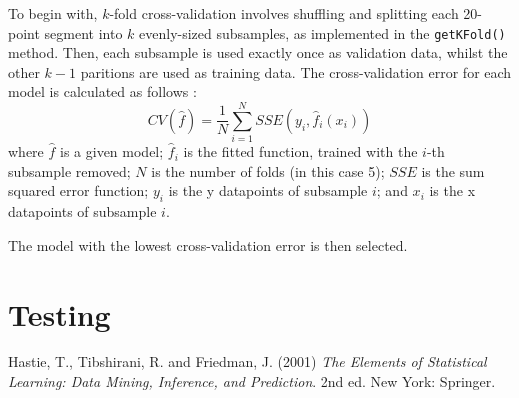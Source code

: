 \documentclass[onecolumn, 12pt, a4paper]{article}
\begin{document}
To begin with, $k$-fold cross-validation involves shuffling and 
splitting each 20-point segment into $k$ evenly-sized subsamples,
as implemented in the \texttt{getKFold()} method.
Then, each subsample is used exactly once as validation data,
whilst the other $k - 1$ paritions are used as training data.
The cross-validation error for each model is calculated
as follows \cite{EOSL}:
\[
    CV({\hat{f}}) = \frac{1}{N}\sum_{i = 1}^{N}SSE(y_{i}, \hat{f}_{i}(x_{i}))
\]
where
$\hat{f}$ is a given model;
$\hat{f}_{i}$ is the fitted function, trained with the $i$-th subsample removed;
$N$ is the number of folds (in this case 5);
$SSE$ is the sum squared error function;
$y_{i}$ is the y datapoints of subsample $i$;
and $x_{i}$ is the x datapoints of subsample $i$.

The model with the lowest cross-validation error is then selected.

\section{Testing}

\begin{thebibliography}{9}
    Hastie, T., Tibshirani, R. and Friedman, J. (2001)
    \textit{The Elements of Statistical Learning: Data Mining, Inference, and Prediction}. 
    2nd ed. New York: Springer.
\end{thebibliography}
    
\end{document}

